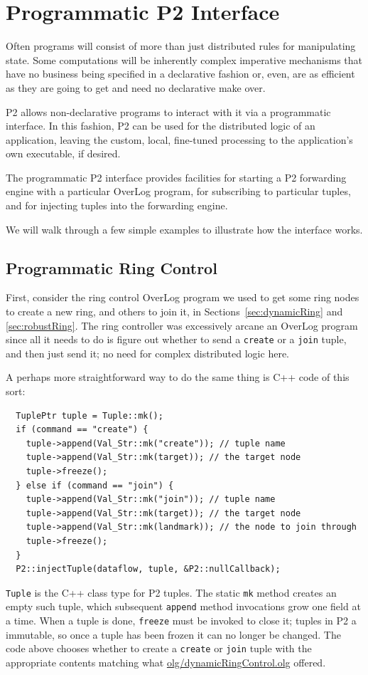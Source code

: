 \documentclass{article}
\begin{document}
\section{Programmatic P2 Interface}
\label{sec:interface}

Often programs will consist of more than just distributed rules for
manipulating state. Some computations will be inherently complex
imperative mechanisms that have no business being specified in a
declarative fashion or, even, are as efficient as they are going to get
and need no declarative make over.

P2 allows  non-declarative programs to interact with it via a
programmatic interface.  In this fashion, P2 can be used for the
distributed logic of an application, leaving the custom, local,
fine-tuned processing to the application's own executable, if desired.

The programmatic P2 interface provides facilities for starting a P2
forwarding engine with a particular OverLog program, for subscribing to
particular tuples, and for injecting tuples into the forwarding engine.

We will walk through a few simple examples to illustrate how the
interface works.

\subsection{Programmatic Ring Control}
First, consider the ring control OverLog program we
used to get some ring nodes to create a new ring, and others to join it,
in Sections~\ref{sec:dynamicRing} and \ref{sec:robustRing}. The ring
controller was excessively arcane an OverLog program since all it needs
to do is figure out whether to send a \lstinline$create$ or a
\lstinline$join$ tuple, and then just send it; no need for complex
distributed logic here.

A perhaps more straightforward way to do the same thing is C++ code of
this sort:
\begin{verbatim}
  TuplePtr tuple = Tuple::mk();
  if (command == "create") {
    tuple->append(Val_Str::mk("create")); // tuple name
    tuple->append(Val_Str::mk(target)); // the target node
    tuple->freeze();
  } else if (command == "join") {
    tuple->append(Val_Str::mk("join")); // tuple name
    tuple->append(Val_Str::mk(target)); // the target node
    tuple->append(Val_Str::mk(landmark)); // the node to join through
    tuple->freeze();
  }
  P2::injectTuple(dataflow, tuple, &P2::nullCallback);
\end{verbatim}
\texttt{Tuple} is the C++ class type for P2 tuples. The static
\texttt{mk} method creates an empty such tuple, which subsequent
\texttt{append} method invocations grow one field at a time. When a tuple
is done, \texttt{freeze} must be invoked to close it; tuples in P2 a
immutable, so once a tuple has been frozen it can no longer be changed.
The code above chooses whether to create a \lstinline$create$ or
\lstinline$join$ tuple with the appropriate contents matching what
\url{olg/dynamicRingControl.olg} offered.
\end{document}
